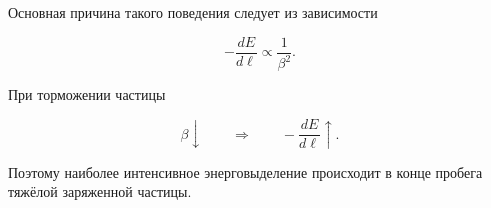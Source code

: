 \documentclass[../final.tex]{subfiles}
\begin{document}
Основная причина такого поведения следует из зависимости

\begin{equation*}
    -
    \frac{dE}{d\ell}
    \propto
    \frac{1}{\beta^2}.
\end{equation*}

При торможении частицы

\begin{equation*}
    \beta
    \downarrow
    \qquad
    \Longrightarrow
    \qquad
    -
    \frac{dE}{d\ell}
    \uparrow.
\end{equation*}

Поэтому наиболее интенсивное энерговыделение происходит
в конце пробега тяжёлой заряженной частицы.
\end{document}
